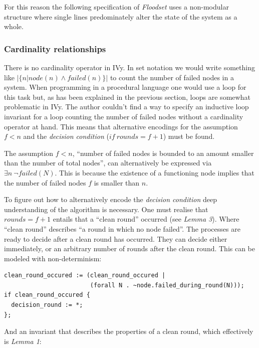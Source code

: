 \documentclass[fleqn]{article}
\begin{document}
For this reason the following specification of \textit{Floodset} uses a non-modular structure where single lines predominately alter the state of the system as a whole.


\subsubsection{Cardinality relationships}
There is no cardinality operator in IVy. In set notation we would write something like $|\{n|node(n) \land failed(n)\}|$ to count the number of failed nodes in a system. When programming in a procedural language one would use a loop for this task but, as has been explained in the previous section, loops are somewhat problematic in IVy. The author couldn't find a way to specify an inductive loop invariant for a loop counting the number of failed nodes without a cardinality operator at hand. This means that alternative encodings for the assumption $f<n$ and the \textit{decision condition} ($if\ rounds = f+1$) must be found.

The assumption $f<n$, ``number of failed nodes is bounded to an amount smaller than the number of total nodes'', can alternatively be expressed via $\exists n\ \neg failed(N)$. This is because the existence of a functioning node implies that the number of failed nodes $f$ is smaller than $n$.

To figure out how to alternatively encode the \textit{decision condition} deep understanding of the algorithm is necessary. One must realise that $rounds = f+1$ entails that a ``clean round'' occurred (see \textit{Lemma 3}). Where ``clean round'' describes ``a round in which no node failed''. The processes are ready to decide after a clean round has occurred. They can decide either immediately, or an arbitrary number of rounds after the clean round. This can be modeled with non-determinism:

\begin{mdframed}[nobreak=true, backgroundcolor=light-gray, roundcorner=10pt,leftmargin=1, rightmargin=1, innerleftmargin=15, innertopmargin=15,innerbottommargin=15, outerlinewidth=1, linecolor=light-gray]
\begin{lstlisting}
clean_round_occured := (clean_round_occured |
                        (forall N . ~node.failed_during_round(N)));
if clean_round_occured {
  decision_round := *;
};
\end{lstlisting}
\end{mdframed}

\noindent And an invariant that describes the properties of a clean round, which effectively is \textit{Lemma 1}:
\end{document}
